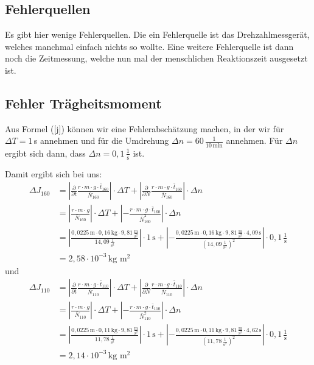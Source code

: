 \documentclass[fontsize=12pt]{scrartcl}
\renewcommand{\l}{\left\vert}
\renewcommand{\r}{\right\vert}
\newcommand{\ddt}{\frac{\partial}{\partial t}}
\newcommand{\ddn}{\frac{\partial}{\partial N}}
\begin{document}
\subsection{Fehlerquellen}

Es gibt hier wenige Fehlerquellen. Die ein Fehlerquelle ist das Drehzahlmessgerät, welches manchmal einfach nichts so wollte. Eine weitere Fehlerquelle ist dann noch die Zeitmessung, welche nun mal der menschlichen Reaktionszeit ausgesetzt ist. 

\subsection{Fehler Trägheitsmoment}

Aus Formel (\ref{j}) können wir eine Fehlerabschätzung machen, in der wir für $\Delta T= 1$\,s annehmen und für die Umdrehung $\Delta n = 60\,\frac{1}{10\,\text{min}}$ annehmen. Für $\Delta n$ ergibt sich dann, dass $\Delta n = 0,1\,\frac{1}{\text{s}}$ ist.

Damit ergibt sich bei uns:
\begin{align*}
\Delta J_{160} &=\l \ddt \frac{r \cdot m \cdot g \cdot \bar{t}_{160}}{\bar{N}_{160}}  \r  \cdot  \Delta T +\l \ddn \frac{r \cdot m \cdot g \cdot \bar{t}_{160}}{\bar{N}_{160}}  \r \cdot \Delta n \\
&= \l \frac{r \cdot m \cdot g}{\bar{N}_{160}} \r  \cdot  \Delta T +\l- \frac{r \cdot m \cdot g \cdot \bar{t}_{160}}{\bar{N}_{160}^2} \r \cdot \Delta n \\
&= \l \frac{0,0225\,{\text{m}} \cdot 0,16\,{\text{kg}} \cdot 9,81\,\frac{ {\text{m}}}{{\text{s}^2}}}{14,09\,{\frac{1}{\text{s}^2}}} \r  \cdot 1\,\text{s} +\l- \frac{0,0225\,{\text{m}} \cdot 0,16\,{\text{kg}} \cdot 9,81\,\frac{ {\text{m}}}{{\text{s}^2}} \cdot 4,09\,{\text{s}}}{(14,09\,{\frac{1}{\text{s}^2}})^2} \r \cdot 0,1\,\frac{1}{\text{s}} \\
&=2,58 \cdot 10^{-3}\,\text{kg m$^2$}
\end{align*}
und 
\begin{align*}
\Delta J_{110} &=\l \ddt \frac{r \cdot m \cdot g \cdot \bar{t}_{110}}{\bar{N}_{110}}  \r  \cdot  \Delta T +\l \ddn \frac{r \cdot m \cdot g \cdot \bar{t}_{110}}{\bar{N}_{110}}  \r \cdot \Delta n \\
&= \l \frac{r \cdot m \cdot g}{\bar{N}_{110}} \r  \cdot  \Delta T +\l- \frac{r \cdot m \cdot g \cdot \bar{t}_{110}}{\bar{N}_{110}^2} \r \cdot \Delta n \\
&= \l \frac{0,0225\,{\text{m}} \cdot 0,11\,{\text{kg}} \cdot 9,81\,\frac{ {\text{m}}}{{\text{s}^2}}}{11,78\,{\frac{1}{\text{s}^2}}} \r  \cdot 1\,\text{s} +\l- \frac{0,0225\,{\text{m}} \cdot 0,11\,{\text{kg}} \cdot 9,81\,\frac{ {\text{m}}}{{\text{s}^2}} \cdot 4,62\,{\text{s}}}{(11,78\,{\frac{1}{\text{s}^2}})^2} \r \cdot 0,1\,\frac{1}{\text{s}} \\
&=2,14 \cdot 10^{-3}\,\text{kg m$^2$}
\end{align*}
\end{document}
